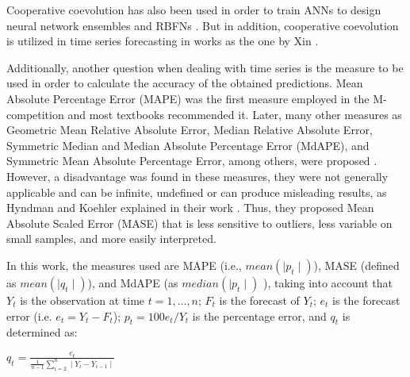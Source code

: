 \documentclass[a4paper,twoside]{article}
\begin{document}

Cooperative coevolution \cite{Potter94} has also been used in order to train ANNs to design neural network ensembles \cite{Garcia-Pedrajas05} and RBFNs \cite{Li08}. But in addition, cooperative coevolution is utilized in time series forecasting in works as the one by Xin \cite{Xin10}. %



Additionally, another question when dealing with time series is the measure to be used in order to calculate the accuracy of the obtained predictions. Mean Absolute Percentage Error (MAPE) \cite{Bowerman2004} was the first measure employed in the M-competition \cite{Makridakis1982} and most textbooks recommended it. Later, many other measures as Geometric Mean Relative Absolute Error, Median Relative Absolute Error, Symmetric Median and Median Absolute Percentage Error (MdAPE), and Symmetric Mean Absolute Percentage Error, among others, were proposed \cite{Makridakis2000}. However, a disadvantage was found in these measures, they were not generally applicable and can be infinite, undefined or can produce misleading results, as Hyndman and Koehler explained in their work \cite{Hyndman2006}. Thus, they proposed Mean Absolute Scaled Error (MASE) that is less sensitive to outliers, less variable on small samples, and more easily interpreted.

In this work, the measures used are MAPE (i.e., $mean(\mid p_t\mid)$), MASE (defined as $mean(\mid q_t\mid)$), and MdAPE (as $median(\mid p_t\mid)$ ), taking into account that $Y_t$ is the observation at time $t = {1,...,n}$; $F_t$ is the forecast of $Y_t$; $e_t$ is the forecast error (i.e. $e_t= Y_t - F_t$); $p_t = 100e_t/Y_t$ is the percentage error, and $q_t$ is determined as:

 \begin{center}
 \smallskip
 $q_t = \displaystyle\frac{e_t}{\displaystyle\frac{1}{n-1} \sum_{i=2}^n \mid Y_i - Y_{i-1} \mid }$
 \end{center}


\end{document}
